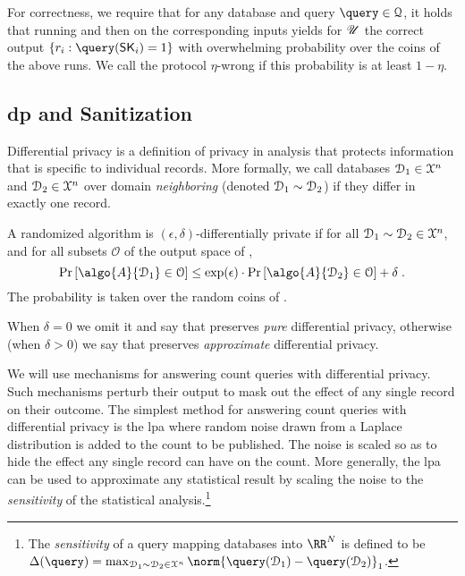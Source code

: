 		For correctness, we require that for any database \databaseDef{} and query $\query \in \querySet$, it holds that running \protocolSetup{} and then \protocolQuery{} on the corresponding inputs yields for $\mathscr{U}{}$ the correct output $\{ \record_i : \query( \searchKey_i ) = 1 \}$ with overwhelming probability over the coins of the above runs.
		We call the protocol $\eta$-wrong if this probability is at least $1 - \eta$.

	\subsection{\texorpdfstring{\acrlong{dp}}{Differential Privacy} and Sanitization}\label{section:range-persistent:building-blocks:dp}

		Differential privacy is a definition of privacy in analysis that protects information that is specific to individual records.
		More formally, we call databases $\mathcal{D}_1 \in \mathcal{X}^{n}$ and $\mathcal{D}_2 \in \mathcal{X}^{n}$ over domain \searchKeyDomain{} \emph{neighboring} (denoted $\mathcal{D}_1 \sim \mathcal{D}_2$) if they differ in exactly one record.

		\begin{definition}[\cite{our-data-ourselves, differential-privacy-original}]

			A randomized algorithm  is $(\epsilon, \delta)$-differentially private if for all $\mathcal{D}_1 \sim \mathcal{D}_2 \in \mathcal{X}^{n}$, and for all subsets $\mathcal{O}$ of the output space of ,
			\[
				\probability{ \algo{A}{ \database_1 } \in \mathcal{O} } \leq \exp(\epsilon) \cdot \probability{ \algo{A}{ \database_2 } \in \mathcal{O} } + \delta \; .
			\]
			The probability is taken over the random coins of .
		\end{definition}

		When $\delta = 0$ we omit it and say that  preserves \emph{pure} differential privacy, otherwise (when $\delta > 0$) we say that  preserves \emph{approximate} differential privacy.

		We will use mechanisms for answering count queries with differential privacy.
		Such mechanisms perturb their output to mask out the effect of any single record on their outcome.
		The simplest method for answering count queries with differential privacy is the \acrfull{lpa} \cite{differential-privacy-original} where random noise drawn from a Laplace distribution is added to the count to be published.
		The noise is scaled so as to hide the effect any single record can have on the count.
		More generally, the \acrshort{lpa} can be used to approximate any statistical result by scaling the noise to the \emph{sensitivity} of the statistical analysis.\footnote{
			The \emph{sensitivity} of a query \query{} mapping databases into $\RR^\domainSize$ is defined to be $\Delta(\query) = \max_{\database_1 \sim \database_2 \in \searchKeyDomain^\dataSize} \norm{ \query(\database_1) - \query(\database_2) }_1$.
		}

